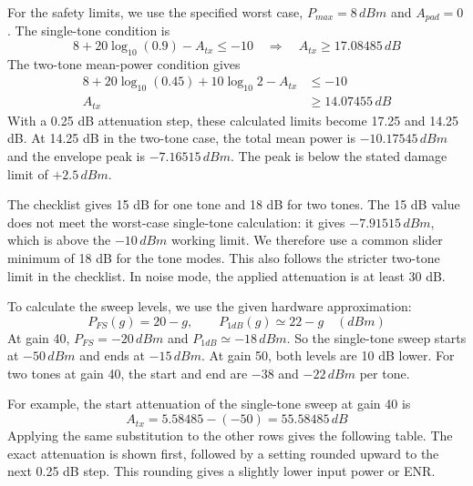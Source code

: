 \documentclass[]{article}
\begin{document}
    For the safety limits, we use the specified worst case, $P_{max}=8\,dBm$ and $A_{pad}=0$. The single-tone condition is
    \begin{equation*}
        8+20\log_{10}(0.9)-A_{tx}\leq-10
        \quad\Rightarrow\quad A_{tx}\geq17.08485\,dB
    \end{equation*}
    The two-tone mean-power condition gives
    \begin{equation*}
        \begin{split}
        8+20\log_{10}(0.45)+10\log_{10}2-A_{tx}&\leq-10\\
        A_{tx}&\geq14.07455\,dB
        \end{split}
    \end{equation*}
    With a 0.25 dB attenuation step, these calculated limits become 17.25 and 14.25 dB. At 14.25 dB in the two-tone case, the total mean power is $-10.17545\,dBm$ and the envelope peak is $-7.16515\,dBm$. The peak is below the stated damage limit of $+2.5\,dBm$.

    The checklist gives 15 dB for one tone and 18 dB for two tones. The 15 dB value does not meet the worst-case single-tone calculation: it gives $-7.91515\,dBm$, which is above the $-10\,dBm$ working limit. We therefore use a common slider minimum of 18 dB for the tone modes. This also follows the stricter two-tone limit in the checklist. In noise mode, the applied attenuation is at least 30 dB.

    To calculate the sweep levels, we use the given hardware approximation:
    \begin{equation*}
        P_{FS}(g)=20-g,\qquad P_{1dB}(g)\simeq22-g\quad(dBm)
    \end{equation*}
    At gain 40, $P_{FS}=-20\,dBm$ and $P_{1dB}\simeq-18\,dBm$. So the single-tone sweep starts at $-50\,dBm$ and ends at $-15\,dBm$. At gain 50, both levels are 10 dB lower. For two tones at gain 40, the start and end are $-38$ and $-22\,dBm$ per tone.

    For example, the start attenuation of the single-tone sweep at gain 40 is
    \begin{equation*}
        A_{tx}=5.58485-(-50)=55.58485\,dB
    \end{equation*}
    Applying the same substitution to the other rows gives the following table. The exact attenuation is shown first, followed by a setting rounded upward to the next 0.25 dB step. This rounding gives a slightly lower input power or ENR.
\end{document}
